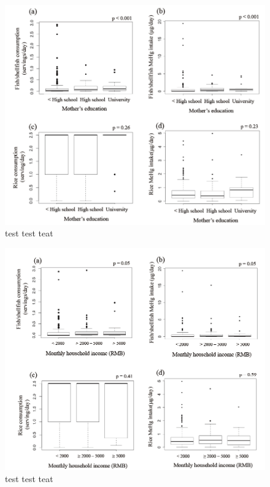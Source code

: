 \begin{figure}
  \centering
    \label{fig:Fig214}
  \includegraphics[scale=1]{Figures/Fig214.pdf}
  \caption[test caption]{test test teat}
\end{figure}

\begin{figure}
  \centering
    \label{fig:Fig215}
  \includegraphics[scale=1]{Figures/Fig215.pdf}
  \caption[test caption]{test test teat}
\end{figure}

